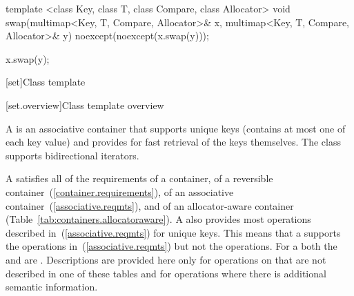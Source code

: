 %
%
\begin{itemdecl}
template <class Key, class T, class Compare, class Allocator>
  void swap(multimap<Key, T, Compare, Allocator>& x,
            multimap<Key, T, Compare, Allocator>& y)
    noexcept(noexcept(x.swap(y)));
\end{itemdecl}

\begin{itemdescr}
\pnum
\effects
\begin{codeblock}
x.swap(y);
\end{codeblock}
\end{itemdescr}

[set]{Class template }

[set.overview]{Class template  overview}

\pnum
{}%
A
is an associative container that supports unique keys (contains at most one of each key value) and
provides for fast retrieval of the keys themselves.
The
 class
supports bidirectional iterators.

\pnum
A  satisfies all of the requirements of a container, of a reversible
container~(\ref{container.requirements}), of an associative
container~(\ref{associative.reqmts}), and of an allocator-aware container
(Table~\ref{tab:containers.allocatoraware}).
A
also provides most operations described in~(\ref{associative.reqmts})
for unique keys.
This means that a
supports the
operations in~(\ref{associative.reqmts})
but not the
operations.
For a
both the
and
are
.
Descriptions are provided here only for operations on
that are not described in one of these tables
and for operations where there is additional semantic information.

